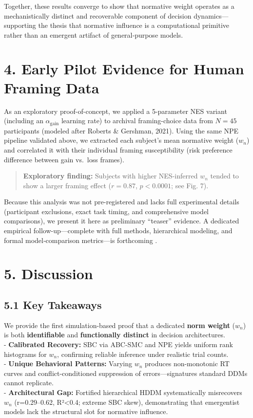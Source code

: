 \documentclass[
  11pt,
]{article}
\begin{document}
Together, these results converge to show that normative weight operates
as a mechanistically distinct and recoverable component of decision
dynamics---supporting the thesis that normative influence is a
computational primitive rather than an emergent artifact of
general‐purpose models.

\section{4. Early Pilot Evidence for Human Framing
Data}\label{early-pilot-evidence-for-human-framing-data}

As an exploratory proof-of-concept, we applied a 5-parameter NES variant
(including an \(\alpha_{\text{gain}}\) learning rate) to archival
framing-choice data from \(N=45\) participants (modeled after Roberts \&
Gershman, 2021). Using the same NPE pipeline validated above, we
extracted each subject's mean normative weight (\(w_n\)) and correlated
it with their individual framing susceptibility (risk preference
difference between gain vs.~loss frames).

\begin{quote}
\textbf{Exploratory finding:} Subjects with higher NES-inferred \(w_n\)
tended to show a larger framing effect (\(r=0.87\), \(p<0.0001\); see
Fig. 7).
\end{quote}

Because this analysis was not pre-registered and lacks full experimental
details (participant exclusions, exact task timing, and comprehensive
model comparisons), we present it here as preliminary ``teaser''
evidence. A dedicated empirical follow-up---complete with full methods,
hierarchical modeling, and formal model‐comparison metrics---is
forthcoming \autocite{WrightInPrep}.

\section{5. Discussion}\label{discussion}

\subsection{5.1 Key Takeaways}\label{key-takeaways}

We provide the first simulation-based proof that a dedicated
\textbf{norm weight} (\(w_n\)) is both \textbf{identifiable} and
\textbf{functionally distinct} in decision architectures.\\
- \textbf{Calibrated Recovery:} SBC via ABC-SMC and NPE yields uniform
rank histograms for \(w_n\), confirming reliable inference under
realistic trial counts.\\
- \textbf{Unique Behavioral Patterns:} Varying \(w_n\) produces
non-monotonic RT curves and conflict-conditioned suppression of
errors---signatures standard DDMs cannot replicate.\\
- \textbf{Architectural Gap:} Fortified hierarchical HDDM systematically
misrecovers \(w_n\) (r=0.29--0.62, R²\textless0.4; extreme SBC skew),
demonstrating that emergentist models lack the structural slot for
normative influence.
\end{document}
